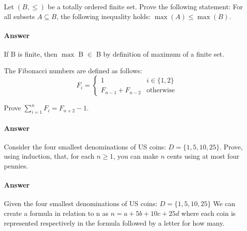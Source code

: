 \documentclass{article}
\begin{document}
 

Let $(B,\leq)$ be a totally ordered finite set. Prove the following
statement: For all subsets $A \subseteq B$, the following inequality
holds: $\max(A) \leq \max(B)$.

\paragraph{Answer}

If B is finite, then $\max$ B $\in$ B by definition of maximum of a finite set.
\collab{\todo{}} 

The Fibonacci numbers are defined as follows:
$$
    F_i = \begin{cases}
            1 & i \in \{1,2\} \\
            F_{n-1}+F_{n-2} & \text{otherwise}
          \end{cases}
$$

Prove $\sum_{i=1}^n F_i = F_{n+2}-1$.

\paragraph{Answer}


 

Consider the four smallest denominations of US coins: $D=\{1,5,10,25\}$.  Prove, using
induction, that, for each $n \geq 1$, you can make $n$ cents using at most four
pennies.

\paragraph{Answer}

Given the four smallest denominations of US coins: $D=\{1,5,10,25\}$ We can create
a formula in relation to n as $n = a+5b+10c+25d$ where each coin is represented respectively
in the formula followed by a letter for how many.
\end{document}
